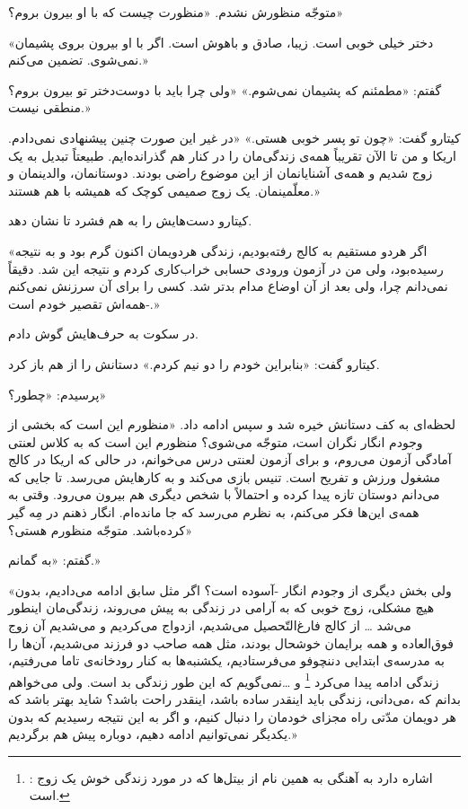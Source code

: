 \documentclass[a5paper]{book}
\begin{document}
متوجّه منظورش نشدم. «منظورت چیست که با او بیرون بروم؟»

«دختر خیلی خوبی است. زیبا، صادق و باهوش است. اگر با او بیرون بروی پشیمان نمی‌شوی. تضمین می‌کنم.»

گفتم: «مطمئنم که پشیمان نمی‌شوم.» «ولی چرا باید با دوست‌دختر تو بیرون بروم؟ منطقی نیست.»

کیتارو گفت: «چون تو پسر خوبی هستی.» «در غیر این صورت چنین پیشنهادی نمی‌دادم. اریکا و من تا الآن تقریباً همه‌ی زندگی‌مان را در کنار هم گذرانده‌ایم. طبیعتاً تبدیل به یک زوج شدیم و همه‌ی آشنایانمان از این موضوع راضی بودند. دوستانمان، والدینمان و معلّمینمان. یک زوج صمیمی کوچک که همیشه با هم هستند.»

کیتارو دست‌هایش را به هم فشرد تا نشان دهد.

«اگر هردو مستقیم به کالج رفته‌بودیم، زندگی هردویمان اکنون گرم بود و به نتیجه رسیده‌بود، ولی من در آزمون ورودی حسابی خراب‌کاری کردم و نتیجه این شد. دقیقاً نمی‌دانم چرا، ولی بعد از آن اوضاع مدام بدتر شد. کسی را برای آن سرزنش نمی‌کنم -همه‌اش تقصیر خودم است.»

در سکوت به حرف‌هایش گوش دادم.

کیتارو گفت: «بنابراین خودم را دو نیم کردم.» دستانش را از هم باز کرد.

پرسیدم: «چطور؟»

لحظه‌ای به کف دستانش خیره شد و سپس ادامه داد. «منظورم این است که بخشی از وجودم انگار نگران است، متوجّه می‌شوی؟ منظورم این است که به کلاس لعنتی آمادگی آزمون می‌روم، و برای آزمون لعنتی درس می‌خوانم، در حالی که اریکا در کالج مشغول ورزش و تفریح است. تنیس بازی می‌کند و به کارهایش می‌رسد. تا جایی که می‌دانم دوستان تازه پیدا کرده و احتمالاً  با شخص دیگری هم بیرون می‌رود. وقتی به همه‌ی این‌ها فکر می‌کنم، به نظرم می‌رسد که جا مانده‌ام. انگار ذهنم در مِه گیر کرده‌باشد. متوجّه منظورم هستی؟»

گفتم: «به گمانم.»

«ولی بخش دیگری از وجودم انگار -آسوده‌ است؟ اگر مثل سابق ادامه می‌دادیم، بدون هیچ مشکلی، زوج خوبی که به آرامی در زندگی به پیش می‌روند، زندگی‌مان اینطور می‌شد \ldots 
از کالج فارغ‌التّحصیل می‌شدیم، ازدواج می‌کردیم و می‌شدیم آن زوج فوق‌العاده و همه برایمان خوشحال بودند، مثل همه صاحب دو فرزند می‌شدیم، آن‌ها را به مدرسه‌ی ابتدایی دننچوفو می‌فرستادیم، یکشنبه‌ها به کنار رودخانه‌ی تاما می‌رفتیم، زندگی ادامه پیدا می‌کرد
\footnote{
: اشاره دارد به آهنگی به همین نام از بیتل‌ها که در مورد زندگی خوش یک زوج است.}
و \ldots نمی‌گویم که این طور زندگی بد است. ولی می‌خواهم بدانم که ،می‌دانی، زندگی باید اینقدر ساده باشد، اینقدر راحت باشد؟ شاید بهتر باشد که هر دویمان مدّتی راه مجزای خودمان را دنبال کنیم، و اگر به این نتیجه رسیدیم که بدون یکدیگر نمی‌توانیم ادامه دهیم، دوباره پیش هم برگردیم.»
\end{document}
